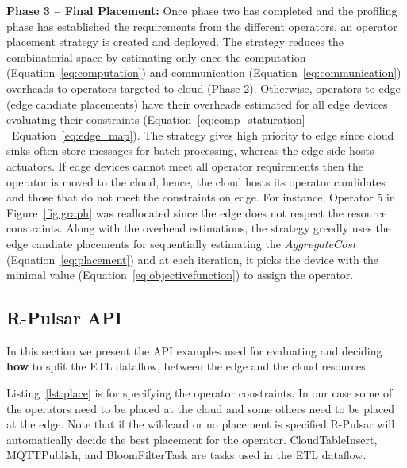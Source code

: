 \begin{algorithm}[ht]
{  
  
    
  
}

\end{algorithm}
\hfill \break
\textbf{Phase 3 -- Final Placement:} 
Once phase two has completed and the profiling phase has established the requirements from the different operators, an operator placement strategy is created and deployed. The strategy reduces the combinatorial space by estimating only once the computation (Equation~\ref{eq:computation}) and communication (Equation~\ref{eq:communication}) overheads to operators targeted to cloud (Phase 2). Otherwise, operators to edge (edge candiate placements) have their overheads estimated for all edge devices evaluating their constraints (Equation~\ref{eq:comp_staturation} --~Equation~\ref{eq:edge_map}). The strategy gives high priority to edge since cloud sinks often store messages for batch processing, whereas the edge side hosts actuators.
If edge devices cannot meet all operator requirements then the operator is moved to the cloud, hence, the cloud hosts its operator candidates and those that do not meet the constraints on edge. For instance, Operator 5 in Figure~\ref{fig:graph} was reallocated since the edge does not respect the resource constraints. Along with the overhead estimations, the strategy greedly uses the edge candiate placements for sequentially estimating the $AggregateCost$ (Equation~\ref{eq:placement}) and at each iteration, it picks the device with the minimal value (Equation~\ref{eq:objectivefunction}) to assign the operator.

\subsection{R-Pulsar API}
\label{sec:api}
In this section we present the API examples used for evaluating and deciding \textbf{how} to split the ETL dataflow, between the edge and the cloud resources. 

Listing~\ref{lst:place} is for specifying the operator constraints. In our case some of the operators need to be placed at the cloud and some others need to be placed at the edge. Note that if the wildcard or no placement is specified R-Pulsar will automatically decide the best placement for the operator. CloudTableInsert, MQTTPublish, and BloomFilterTask are tasks used in the ETL dataflow.

